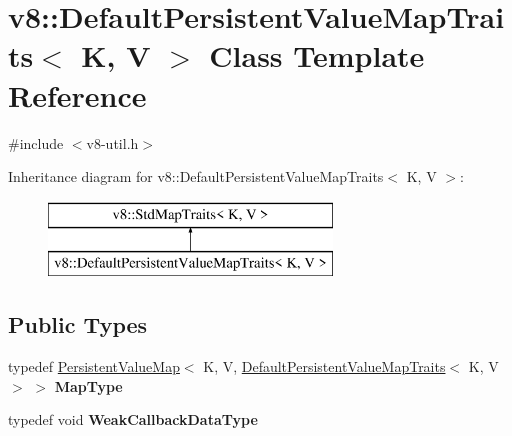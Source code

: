 \hypertarget{classv8_1_1_default_persistent_value_map_traits}{}\section{v8\+:\+:Default\+Persistent\+Value\+Map\+Traits$<$ K, V $>$ Class Template Reference}
\label{classv8_1_1_default_persistent_value_map_traits}


{\ttfamily \#include $<$v8-\/util.\+h$>$}

Inheritance diagram for v8\+:\+:Default\+Persistent\+Value\+Map\+Traits$<$ K, V $>$\+:\begin{figure}[H]
\begin{center}
\leavevmode
\includegraphics[height=2.000000cm]{classv8_1_1_default_persistent_value_map_traits}
\end{center}
\end{figure}
\subsection*{Public Types}
\begin{DoxyCompactItemize}
\item 
\hypertarget{classv8_1_1_default_persistent_value_map_traits_a05cbd536d6bb9ba4949198351e074854}{}typedef \hyperlink{classv8_1_1_persistent_value_map}{Persistent\+Value\+Map}$<$ K, V, \hyperlink{classv8_1_1_default_persistent_value_map_traits}{Default\+Persistent\+Value\+Map\+Traits}$<$ K, V $>$ $>$ {\bfseries Map\+Type}\label{classv8_1_1_default_persistent_value_map_traits_a05cbd536d6bb9ba4949198351e074854}

\item 
\hypertarget{classv8_1_1_default_persistent_value_map_traits_a379f8c42e727a9576fb0954bb0245d8f}{}typedef void {\bfseries Weak\+Callback\+Data\+Type}\label{classv8_1_1_default_persistent_value_map_traits_a379f8c42e727a9576fb0954bb0245d8f}

\end{DoxyCompactItemize}
